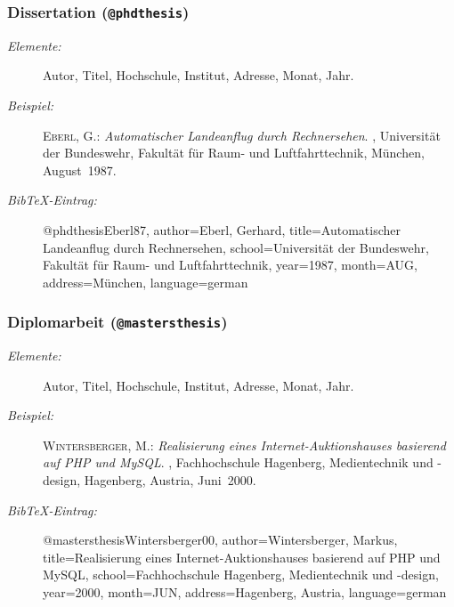 \subsubsection{Dissertation (\texttt{@phdthesis})}
\nocite{Eberl87}

\begin{description}
\item[\it Elemente:] \hfill\break
  Autor, Titel, Hochschule, Institut, Adresse, Monat, Jahr.
\item[\it Beispiel:] \hfill\break
\textsc{Eberl, G.}: \emph{Automatischer Landeanflug durch Rechnersehen}.
\newblock \btxphdthesis{}, Universität der Bundeswehr, Fakultät für
  Raum- und Luftfahrttechnik, München, August\ 1987.
\item[\it BibTeX-Eintrag:] \mbox{}\par
%
\begin{GenericCode}
@phdthesis{Eberl87,
  author={Eberl, Gerhard},
  title={Automatischer Landeanflug durch Rechnersehen},
  school={Universität der Bundeswehr, Fakultät für
	        Raum- und Luftfahrttechnik},
  year={1987},
  month=AUG,
  address={München},
  language={german}
}
\end{GenericCode}
\end{description}

\subsubsection{Diplomarbeit (\texttt{@mastersthesis})}
\nocite{Wintersberger00}

\begin{description}
\item[\it Elemente:] \hfill\break
  Autor, Titel, Hochschule, Institut, Adresse, Monat, Jahr.
\item[\it Beispiel:] \hfill\break
\textsc{Wintersberger, M.}: \emph{Realisierung eines Internet-Auktionshauses
  basierend auf {PHP} und {MySQL}}.
\newblock \btxmastthesis{}, Fachhochschule Hagenberg, Medientechnik und
  -design, Hagenberg, Austria, Juni\ 2000.
\item[\it BibTeX-Eintrag:] \mbox{}\par
%
\begin{GenericCode}
@mastersthesis{Wintersberger00,
  author={Wintersberger, Markus},
  title={Realisierung eines Internet-Auktionshauses
	       basierend auf {PHP} und {MySQL}},
  school={Fachhochschule Hagenberg, Medientechnik und -design},
  year={2000},
  month=JUN,
  address={Hagenberg, Austria},
  language={german}
}
\end{GenericCode}
\end{description}

